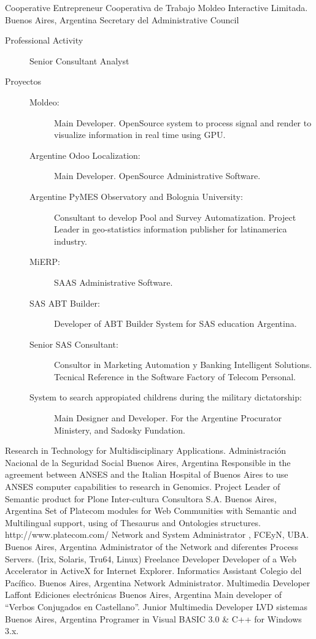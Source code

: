 	{Cooperative Entrepreneur}
	{Cooperativa de Trabajo Moldeo Interactive Limitada.}
	{Buenos Aires, Argentina}
	{Secretary del Administrative Council}
	{\begin{description}
	\item [Professional Activity] Senior Consultant Analyst
	\item [Proyectos]
	\begin{description}
		\item [Moldeo:] Main Developer. OpenSource system to process signal and render to visualize information in real time using GPU.
		\item [Argentine Odoo Localization:] Main Developer. OpenSource Administrative Software.
		\item [Argentine PyMES Observatory and Bolognia University:] Consultant to develop Pool and Survey Automatization. Project Leader in geo-statistics information publisher for latinamerica industry.
		\item [MiERP:] SAAS Administrative Software.
		\item [SAS ABT Builder:] Developer of ABT Builder System for SAS education Argentina.
		\item [Senior SAS Consultant:] Consultor in Marketing Automation y Banking Intelligent Solutions. Tecnical Reference in the Software Factory of Telecom Personal.
		\item [System to search appropiated childrens during the military dictatorship:] Main Designer and Developer. For the Argentine Procurator Ministery, and Sadosky Fundation.
	\end{description}
	\end{description}}
	{Research in Technology for Multidisciplinary Applications.}
	{Administración Nacional de la Seguridad Social}
	{Buenos Aires, Argentina}
	{}
	{Responsible in the agreement between ANSES and the Italian Hospital of Buenos Aires to use ANSES computer capabilities to research in Genomics.}
	{Project Leader of Semantic product for Plone}
	{Inter-cultura Consultora S.A.}
	{Buenos Aires, Argentina}
	{}
	{Set of Platecom modules for Web Communities with Semantic and Multilingual support, using of Thesaurus and Ontologies structures.  http://www.platecom.com/}
	{Network and System Administrator}
	{\UBA, FCEyN, UBA.}
	{Buenos Aires, Argentina}
	{}
	{Administrator of the Network and diferentes Process Servers. (Irix, Solaris, Tru64, Linux)}
	{Freelance Developer}
	{}
	{}
	{}
	{Developer of a Web Accelerator in ActiveX for Internet Explorer.}
	{Informatics Assistant}
	{Colegio del Pacífico.}
	{Buenos Aires, Argentina}
	{}
	{Network Administrator. }
	{Multimedia Developer}
	{Laffont Ediciones electrónicas}
	{Buenos Aires, Argentina}
	{}
	{Main developer of ``Verbos Conjugados en Castellano''.}
	{Junior Multimedia Developer}
	{LVD sistemas}
	{Buenos Aires, Argentina}
	{}
	{Programer in Visual BASIC 3.0 \& C++ for Windows 3.x.}
\label{profesional:hasta}

